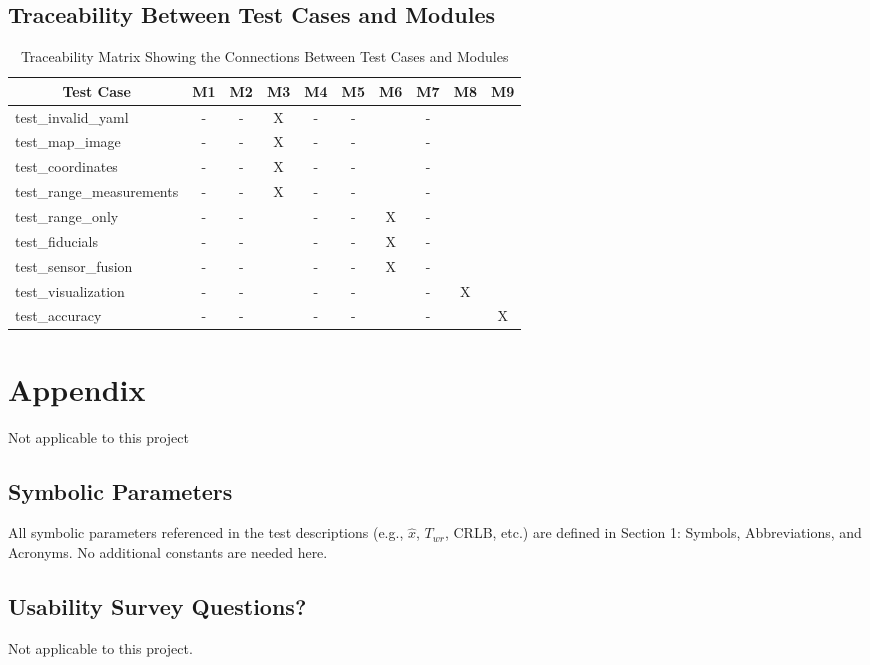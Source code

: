 \documentclass[12pt, titlepage]{article}
\begin{document}
\subsection{Traceability Between Test Cases and Modules}

\begin{table}[h!]
  \centering
  \begin{tabular}{|l|c|c|c|c|c|c|c|c|c|}
  \hline
  \multicolumn{1}{|c|}{\textbf{Test Case}} & \textbf{M1} & \textbf{M2} & \textbf{M3} & \textbf{M4} & \textbf{M5} & \textbf{M6} & \textbf{M7} & \textbf{M8} & \textbf{M9} \\ \hline
  test\_invalid\_yaml       & - & - & X & - & - &   & - &   &   \\
  test\_map\_image          & - & - & X & - & - &   & - &   &   \\
  test\_coordinates         & - & - & X & - & - &   & - &   &   \\
  test\_range\_measurements & - & - & X & - & - &   & - &   &   \\ \hline
  test\_range\_only         & - & - &   & - & - & X & - &   &   \\
  test\_fiducials           & - & - &   & - & - & X & - &   &   \\
  test\_sensor\_fusion      & - & - &   & - & - & X & - &   &   \\ \hline
  test\_visualization       & - & - &   & - & - &   & - & X &   \\ \hline
  test\_accuracy            & - & - &   & - & - &  & - &   & X \\ \hline
  \end{tabular}
  \caption{Traceability Matrix Showing the Connections Between Test Cases and Modules}
  \end{table}

				




\newpage

\section{Appendix}\label{sec_appendix}
 Not applicable to this project

\subsection{Symbolic Parameters}

All symbolic parameters referenced in the test descriptions (e.g., $\hat{x}$, $T_{wr}$, CRLB, etc.) are defined in Section 1: Symbols, Abbreviations, and Acronyms. No additional constants are needed here.


\subsection{Usability Survey Questions?}
Not applicable to this project.

\newpage{}
\end{document}
